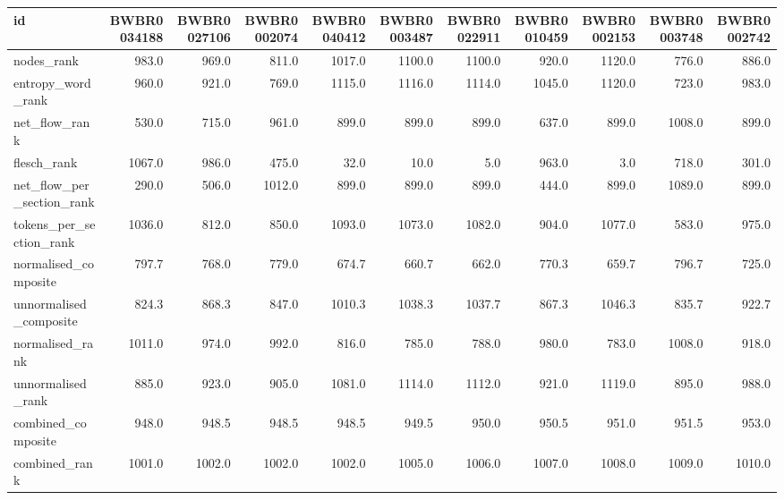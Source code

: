 \begin{tabular}{lrrrrrrrrrr}
\toprule
id & BWBR0034188 & BWBR0027106 & BWBR0002074 & BWBR0040412 & BWBR0003487 & BWBR0022911 & BWBR0010459 & BWBR0002153 & BWBR0003748 & BWBR0002742 \\
\midrule
nodes\_rank & 983.0 & 969.0 & 811.0 & 1017.0 & 1100.0 & 1100.0 & 920.0 & 1120.0 & 776.0 & 886.0 \\
\cline{1-11}
entropy\_word\_rank & 960.0 & 921.0 & 769.0 & 1115.0 & 1116.0 & 1114.0 & 1045.0 & 1120.0 & 723.0 & 983.0 \\
\cline{1-11}
net\_flow\_rank & 530.0 & 715.0 & 961.0 & 899.0 & 899.0 & 899.0 & 637.0 & 899.0 & 1008.0 & 899.0 \\
\cline{1-11}
flesch\_rank & 1067.0 & 986.0 & 475.0 & 32.0 & 10.0 & 5.0 & 963.0 & 3.0 & 718.0 & 301.0 \\
\cline{1-11}
net\_flow\_per\_section\_rank & 290.0 & 506.0 & 1012.0 & 899.0 & 899.0 & 899.0 & 444.0 & 899.0 & 1089.0 & 899.0 \\
\cline{1-11}
tokens\_per\_section\_rank & 1036.0 & 812.0 & 850.0 & 1093.0 & 1073.0 & 1082.0 & 904.0 & 1077.0 & 583.0 & 975.0 \\
\cline{1-11}
normalised\_composite & 797.7 & 768.0 & 779.0 & 674.7 & 660.7 & 662.0 & 770.3 & 659.7 & 796.7 & 725.0 \\
\cline{1-11}
unnormalised\_composite & 824.3 & 868.3 & 847.0 & 1010.3 & 1038.3 & 1037.7 & 867.3 & 1046.3 & 835.7 & 922.7 \\
\cline{1-11}
normalised\_rank & 1011.0 & 974.0 & 992.0 & 816.0 & 785.0 & 788.0 & 980.0 & 783.0 & 1008.0 & 918.0 \\
\cline{1-11}
unnormalised\_rank & 885.0 & 923.0 & 905.0 & 1081.0 & 1114.0 & 1112.0 & 921.0 & 1119.0 & 895.0 & 988.0 \\
\cline{1-11}
combined\_composite & 948.0 & 948.5 & 948.5 & 948.5 & 949.5 & 950.0 & 950.5 & 951.0 & 951.5 & 953.0 \\
\cline{1-11}
combined\_rank & 1001.0 & 1002.0 & 1002.0 & 1002.0 & 1005.0 & 1006.0 & 1007.0 & 1008.0 & 1009.0 & 1010.0 \\
\cline{1-11}
\bottomrule
\end{tabular}
